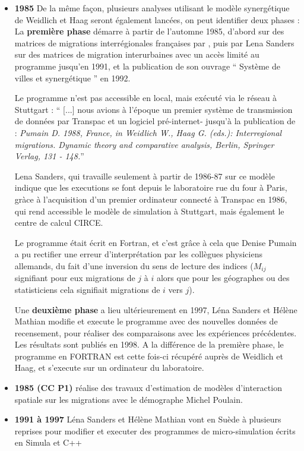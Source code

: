 \begin{itemize}[label=\textbullet]
\item \textbf{1985} De la même façon, plusieurs analyses utilisant le modèle synergétique de Weidlich et Haag seront également lancées, on peut identifier deux phases : La \textbf{première phase} démarre à partir de l’automne 1985, d’abord sur des matrices de migrations interrégionales françaises par \textcite{Pumain1987}, puis par Lena Sanders sur des matrices de migration interurbaines avec un accès limité au programme jusqu’en 1991, et la publication de son ouvrage \enquote{ Système de villes et synergétique } en 1992.

Le programme n'est pas accessible en local, mais exécuté via le réseau à Stuttgart : \enquote{ [...] nous avions à l’époque un premier système de transmission de données par Transpac et un logiciel pré-internet- jusqu’à la publication de \autocite{Pumain1988} : \textit{Pumain D. 1988, France, in Weidlich W., Haag G. (eds.): Interregional migrations. Dynamic theory and comparative analysis, Berlin, Springer Verlag, 131 - 148.}}

Lena Sanders, qui travaille seulement à partir de 1986-87 sur ce modèle indique que les executions se font depuis le laboratoire rue du four à Paris, gràce à l'acquisition d'un premier ordinateur connecté à Transpac en 1986, qui rend accessible le modèle de simulation à Stuttgart, mais également le centre de calcul CIRCE.

Le programme était écrit en Fortran, et c’est grâce à cela que Denise Pumain a pu rectifier une erreur d’interprétation par les collègues physiciens allemands, du fait d’une inversion du sens de lecture des indices ($M_{ij}$ signifiant pour eux migrations de $j$ à $i$ alors que pour les géographes ou des statisticiens cela signifiait migrations de $i$ vers $j$).

Une \textbf{deuxième phase} a lieu ultérieurement en 1997, Léna Sanders et Hélène Mathian modifie et execute le programme avec des nouvelles données de recensement, pour réaliser des comparaisons avec les expériences précédentes. Les résultats sont publiés en 1998. A la différence de la première phase, le programme en FORTRAN est cette fois-ci récupéré auprès de Weidlich et Haag, et s'execute sur un ordinateur du laboratoire.


\item \textbf{1985 (CC P1)} \textcite{Pumain1985} réalise des travaux d’estimation de modèles d’interaction spatiale sur les migrations avec le démographe Michel Poulain.

\item \textbf{1991 à 1997} Léna Sanders et Hélène Mathian vont en Suède à plusieurs reprises pour modifier et executer des programmes de micro-simulation écrits en Simula et C++

\end{itemize}


